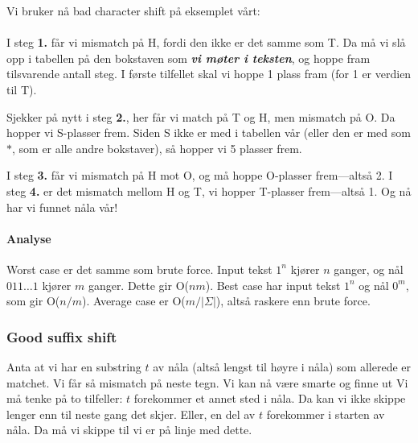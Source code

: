 \begin{eks}
Vi bruker nå bad character shift på eksemplet vårt: \vspace{10pt}\\
\vspace{10pt}\\
I steg \textbf{1.} får vi mismatch på H, fordi den ikke er det samme som T. Da må vi slå opp i tabellen på den bokstaven som \textbf{\textit{vi møter i teksten}}, og hoppe fram tilsvarende antall steg. I første tilfellet skal vi hoppe 1 plass fram (for 1 er verdien til T). 

Sjekker på nytt i steg \textbf{2.}, her får vi match på T og H, men mismatch på O. Da hopper vi S-plasser frem. Siden S ikke er med i tabellen vår (eller den er med som $*$, som er alle andre bokstaver), så hopper vi 5 plasser frem.

I steg \textbf{3.} får vi mismatch på H mot O, og må hoppe O-plasser frem---altså 2. I steg \textbf{4.} er det mismatch mellom H og T, vi hopper T-plasser frem---altså 1. Og nå har vi funnet nåla vår!

\end{eks}

\paragraph{Analyse}
Worst case er det samme som brute force. Input tekst $1^n$ kjører $n$ ganger, og nål $011\dots1$ kjører $m$ ganger. Dette gir O($nm$). Best case har input tekst $1^n$ og nål $0^m$, som gir O($n/m$). Average case er O($m/|\Sigma|$), altså raskere enn brute force.
	
	\subsubsection{Good suffix shift}
		Anta at vi har en substring $t$ av nåla (altså lengst til høyre i nåla) som allerede er matchet. Vi får så mismatch på neste tegn. Vi kan nå være smarte og finne ut
		Vi må tenke på to tilfeller: $t$ forekommer et annet sted i nåla. Da kan vi ikke skippe lenger enn til neste gang det skjer. Eller, en del av $t$ forekommer i starten av nåla. Da må vi skippe til vi er på linje med dette.
	
